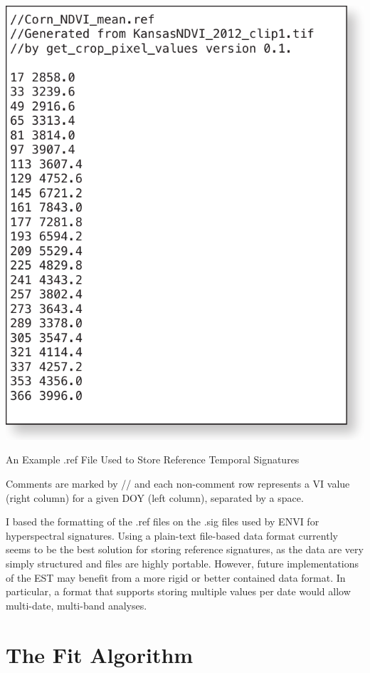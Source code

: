 \begin{ssfigure}
  \centering
  \includegraphics[scale=0.75]{Graphics/reffile.pdf}
  \caption{An Example .ref File Used to Store Reference Temporal Signatures}
  \medskip
  \small
  Comments are marked by // and each non-comment row represents a VI value (right column) for a given DOY (left column), separated by a space.
  \label{fig:reffile}
\end{ssfigure}

I based the formatting of the .ref files on the .sig files used by ENVI for hyperspectral signatures. Using a plain-text file-based data format currently seems to be the best solution for storing reference signatures, as the data are very simply structured and files are highly portable. However, future implementations of the EST may benefit from a more rigid or better contained data format. In particular, a format that supports storing multiple values per date would allow multi-date, multi-band analyses.


\section{The Fit Algorithm}
\label{appendix:tools:fit}

